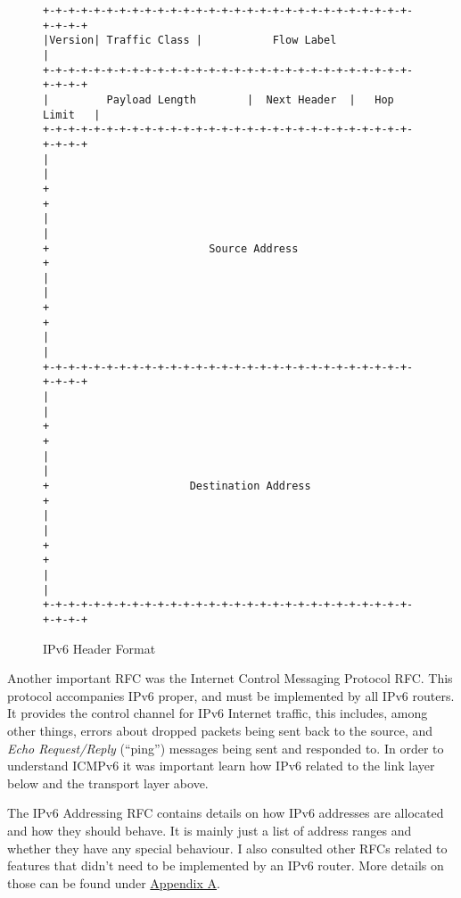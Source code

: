 \documentclass[12pt,a4paper,twoside,openany]{report}
\begin{document}
\begin{figure}
\centering
\begin{varwidth}{\linewidth}
\begin{verbatim}
+-+-+-+-+-+-+-+-+-+-+-+-+-+-+-+-+-+-+-+-+-+-+-+-+-+-+-+-+-+-+-+-+
|Version| Traffic Class |           Flow Label                  |
+-+-+-+-+-+-+-+-+-+-+-+-+-+-+-+-+-+-+-+-+-+-+-+-+-+-+-+-+-+-+-+-+
|         Payload Length        |  Next Header  |   Hop Limit   |
+-+-+-+-+-+-+-+-+-+-+-+-+-+-+-+-+-+-+-+-+-+-+-+-+-+-+-+-+-+-+-+-+
|                                                               |
+                                                               +
|                                                               |
+                         Source Address                        +
|                                                               |
+                                                               +
|                                                               |
+-+-+-+-+-+-+-+-+-+-+-+-+-+-+-+-+-+-+-+-+-+-+-+-+-+-+-+-+-+-+-+-+
|                                                               |
+                                                               +
|                                                               |
+                      Destination Address                      +
|                                                               |
+                                                               +
|                                                               |
+-+-+-+-+-+-+-+-+-+-+-+-+-+-+-+-+-+-+-+-+-+-+-+-+-+-+-+-+-+-+-+-+
\end{verbatim}
\end{varwidth}
\caption{IPv6 Header Format\cite{ipv6_rfc}}
\label{fig::ipv6_header}
\end{figure}

\bigskip

Another important RFC was the Internet Control Messaging Protocol RFC\cite{icmpv6_rfc}.  This protocol accompanies IPv6 proper, and must be implemented by all IPv6 routers.  It provides the control channel for IPv6 Internet traffic, this includes, among other things, errors about dropped packets being sent back to the source, and \textit{Echo Request/Reply} (``ping'') messages being sent and responded to.  In order to understand ICMPv6 it was important learn how IPv6 related to the link layer below and the transport layer above.

\bigskip

The IPv6 Addressing RFC\cite{ipv6_rfc_adr} contains details on how IPv6 addresses are allocated and how they should behave. It is mainly just a list of address ranges and whether they have any special behaviour.  I also consulted other RFCs related to features that didn't need to be implemented by an IPv6 router\cite{dhcpv6_rfc}\cite{slaac_rfc}\cite{ndp_rfc}. More details on those can be found under \hyperref[appendix::requirements]{Appendix A}.
\end{document}
